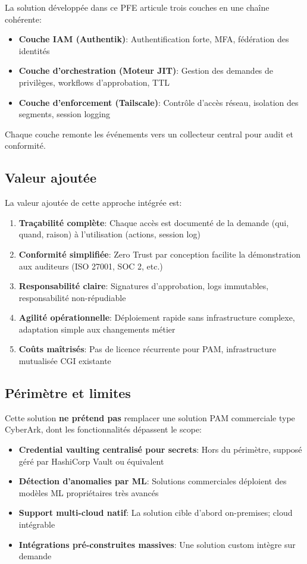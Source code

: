 La solution développée dans ce PFE articule trois couches en une chaîne cohérente:

\begin{itemize}
    \item \textbf{Couche IAM (Authentik)}: Authentification forte, MFA, fédération des identités
    \item \textbf{Couche d'orchestration (Moteur JIT)}: Gestion des demandes de privilèges, workflows d'approbation, TTL
    \item \textbf{Couche d'enforcement (Tailscale)}: Contrôle d'accès réseau, isolation des segments, session logging
\end{itemize}

Chaque couche remonte les événements vers un collecteur central pour audit et conformité.

\subsection{Valeur ajoutée}

La valeur ajoutée de cette approche intégrée est:

\begin{enumerate}
    \item \textbf{Traçabilité complète}: Chaque accès est documenté de la demande (qui, quand, raison) à l'utilisation (actions, session log)
    \item \textbf{Conformité simplifiée}: Zero Trust par conception facilite la démonstration aux auditeurs (ISO 27001, SOC 2, etc.)
    \item \textbf{Responsabilité claire}: Signatures d'approbation, logs immutables, responsabilité non-répudiable
    \item \textbf{Agilité opérationnelle}: Déploiement rapide sans infrastructure complexe, adaptation simple aux changements métier
    \item \textbf{Coûts maîtrisés}: Pas de licence récurrente pour PAM, infrastructure mutualisée CGI existante
\end{enumerate}

\subsection{Périmètre et limites}

Cette solution \textbf{ne prétend pas} remplacer une solution PAM commerciale type CyberArk, dont les fonctionnalités dépassent le scope:

\begin{itemize}
    \item \textbf{Credential vaulting centralisé pour secrets}: Hors du périmètre, supposé géré par HashiCorp Vault ou équivalent
    \item \textbf{Détection d'anomalies par ML}: Solutions commerciales déploient des modèles ML propriétaires très avancés
    \item \textbf{Support multi-cloud natif}: La solution cible d'abord on-premises; cloud intégrable
    \item \textbf{Intégrations pré-construites massives}: Une solution custom intègre sur demande
\end{itemize}

